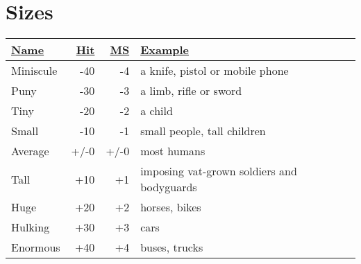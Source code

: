 \section{Sizes}
\label{sizestable}
\begin{tabularx}{\columnwidth}{|l|r|r|X|}
	\hline
	\ul{Name} & \ul{Hit} & \ul{MS} & \ul{Example} \\ \hline
	Miniscule & -40 & -4 & a knife, pistol or mobile phone \\ \hline
	Puny & -30 & -3 & a limb, rifle or sword \\ \hline
	Tiny & -20 & -2 & a child \\ \hline
	Small & -10 & -1 & small people, tall children \\ \hline
	Average & +/-0 & +/-0 & most humans \\ \hline
	Tall & +10 & +1 & imposing vat-grown soldiers and bodyguards \\ \hline
	Huge & +20 & +2 & horses, bikes \\ \hline
	Hulking & +30 & +3 & cars \\ \hline
	Enormous & +40 & +4 & buses, trucks \\ \hline
\end{tabularx}
